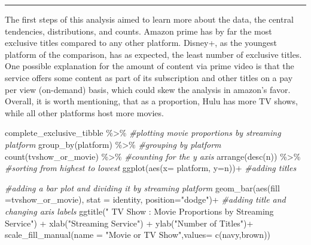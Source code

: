 \documentclass[
]{article}
\newenvironment{Shaded}{\begin{snugshade}}{\end{snugshade}}
\newcommand{\AttributeTok}[1]{\textcolor[rgb]{0.77,0.63,0.00}{#1}}
\newcommand{\CommentTok}[1]{\textcolor[rgb]{0.56,0.35,0.01}{\textit{#1}}}
\newcommand{\FunctionTok}[1]{\textcolor[rgb]{0.00,0.00,0.00}{#1}}
\newcommand{\NormalTok}[1]{#1}
\newcommand{\SpecialCharTok}[1]{\textcolor[rgb]{0.00,0.00,0.00}{#1}}
\newcommand{\StringTok}[1]{\textcolor[rgb]{0.31,0.60,0.02}{#1}}
\begin{document}
\begin{center}\rule{0.5\linewidth}{0.5pt}\end{center}

The first steps of this analysis aimed to learn more about the data, the
central tendencies, distributions, and counts. Amazon prime has by far
the most exclusive titles compared to any other platform. Disney+, as
the youngest platform of the comparison, has as expected, the least
number of exclusive titles. One possible explanation for the amount of
content via prime video is that the service offers some content as part
of its subscription and other titles on a pay per view (on-demand)
basis, which could skew the analysis in amazon's favor.\\
Overall, it is worth mentioning, that as a proportion, Hulu has more TV
shows, while all other platforms host more movies.

\begin{Shaded}
\begin{Highlighting}[]
\NormalTok{complete\_exclusive\_tibble }\SpecialCharTok{\%\textgreater{}\%}     \CommentTok{\#plotting movie proportions by streaming platform}
  \FunctionTok{group\_by}\NormalTok{(platform) }\SpecialCharTok{\%\textgreater{}\%}          \CommentTok{\#grouping by platform}
  \FunctionTok{count}\NormalTok{(tvshow\_or\_movie) }\SpecialCharTok{\%\textgreater{}\%}      \CommentTok{\#counting for the y axis}
  \FunctionTok{arrange}\NormalTok{(}\FunctionTok{desc}\NormalTok{(n)) }\SpecialCharTok{\%\textgreater{}\%}             \CommentTok{\#sorting from highest to lowest}
  \FunctionTok{ggplot}\NormalTok{(}\FunctionTok{aes}\NormalTok{(}\AttributeTok{x=}\NormalTok{ platform, }\AttributeTok{y=}\NormalTok{n))}\SpecialCharTok{+}  \CommentTok{\#adding titles}
  
  \CommentTok{\#adding a bar plot and dividing it by streaming platform}
  \FunctionTok{geom\_bar}\NormalTok{(}\FunctionTok{aes}\NormalTok{(}\AttributeTok{fill =}\NormalTok{tvshow\_or\_movie), }\AttributeTok{stat =} \StringTok{\textquotesingle{}identity\textquotesingle{}}\NormalTok{, }\AttributeTok{position=}\StringTok{"dodge"}\NormalTok{)}\SpecialCharTok{+}
  \CommentTok{\#adding title and changing axis labels}
  \FunctionTok{ggtitle}\NormalTok{(}\StringTok{"       TV Show : Movie Proportions by Streaming Service"}\NormalTok{) }\SpecialCharTok{+}
  \FunctionTok{xlab}\NormalTok{(}\StringTok{"Streaming Service"}\NormalTok{) }\SpecialCharTok{+} \FunctionTok{ylab}\NormalTok{(}\StringTok{"Number of Titles"}\NormalTok{)}\SpecialCharTok{+}
  \FunctionTok{scale\_fill\_manual}\NormalTok{(}\AttributeTok{name =} \StringTok{"Movie or TV Show"}\NormalTok{,}\AttributeTok{values=} \FunctionTok{c}\NormalTok{(}\StringTok{\textquotesingle{}navy\textquotesingle{}}\NormalTok{,}\StringTok{\textquotesingle{}brown\textquotesingle{}}\NormalTok{))}
\end{Highlighting}
\end{Shaded}
\end{document}
